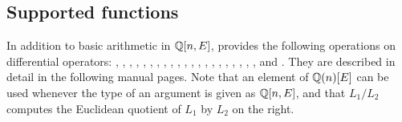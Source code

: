 \subsection{Supported functions}
In addition to basic arithmetic in ${\mathbb{Q}}[n,E]$, \shasta{} provides the following
operations on differential operators:
, , ,
, , ,
, ,
,
,
,
,
, ,
,
, ,
, ,
, ,
  and .
They are described in detail in the following manual pages.
Note that an element of ${\mathbb{Q}}(n)[E]$ can be used
whenever the type of an argument is given as ${\mathbb{Q}}[n,E]$,
and that $L_1 / L_2$ computes the Euclidean quotient of
$L_1$ by $L_2$ on the right.



